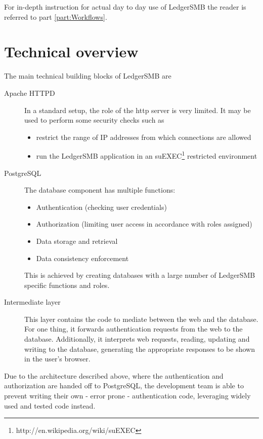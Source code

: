 For in-depth instruction for actual day to day use of LedgerSMB the reader is referred
to part \ref{part:Workflows}.

\section{Technical overview}




The main technical building blocks of LedgerSMB are

\begin{description}
\item[Apache HTTPD] In a standard setup, the role of the http server is very limited. It
may be used to perform some security checks such as
\begin{itemize}
\item restrict the range of IP addresses from which connections are allowed
\item run the LedgerSMB application in an
suEXEC\footnote{http://en.wikipedia.org/wiki/suEXEC} restricted environment
\end{itemize}
\item[PostgreSQL] The database component has multiple functions:
\begin{itemize}
\item Authentication (checking user credentials)
\item Authorization (limiting user access in accordance with roles assigned)
\item Data storage and retrieval
\item Data consistency enforcement
\end{itemize}
This is achieved by creating databases with a large number of LedgerSMB specific
functions and roles.
\item[Intermediate layer] This layer contains the code to mediate between the web
and the database.  For one thing, it forwards authentication requests from the web
to the database.  Additionally, it interprets web requests, reading, updating and
writing to the database, generating the appropriate responses to be shown in the
user's browser.
\end{description}

Due to the architecture described above, where the authentication and authorization
are handed off to PostgreSQL, the development team is able to prevent writing their
own - error prone - authentication code, leveraging widely used and tested code instead.


